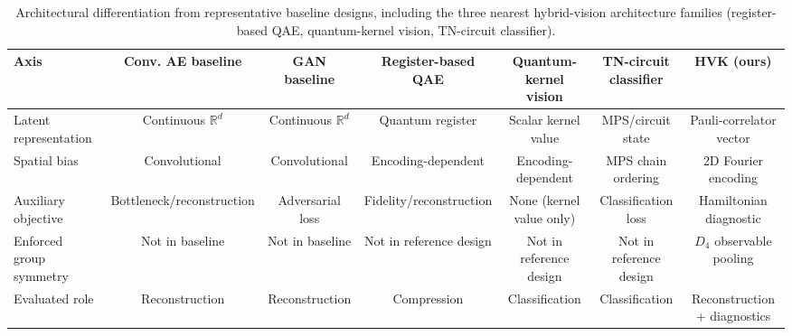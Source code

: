 \documentclass[sn-mathphys,Numbered]{sn-jnl}
\begin{document}
\begin{table}[t]
\centering
\caption{Architectural differentiation from representative baseline designs, including the three nearest hybrid-vision architecture families (register-based QAE, quantum-kernel vision, TN-circuit classifier).}
\label{tab:differentiation}
\scriptsize
\begin{tabular}{lcccccc}
\toprule
Axis & Conv. AE baseline & GAN baseline & Register-based QAE & Quantum-kernel vision & TN-circuit classifier & HVK (ours) \\
\midrule
Latent representation & Continuous $\mathbb{R}^d$ & Continuous $\mathbb{R}^d$ & Quantum register & Scalar kernel value & MPS/circuit state & Pauli-correlator vector \\
Spatial bias & Convolutional & Convolutional & Encoding-dependent & Encoding-dependent & MPS chain ordering & 2D Fourier encoding \\
Auxiliary objective & Bottleneck/reconstruction & Adversarial loss & Fidelity/reconstruction & None (kernel value only) & Classification loss & Hamiltonian diagnostic \\
Enforced group symmetry & Not in baseline & Not in baseline & Not in reference design & Not in reference design & Not in reference design & $D_4$ observable pooling \\
Evaluated role & Reconstruction & Reconstruction & Compression & Classification & Classification & Reconstruction + diagnostics \\
\bottomrule
\end{tabular}
\end{table}
\end{document}
